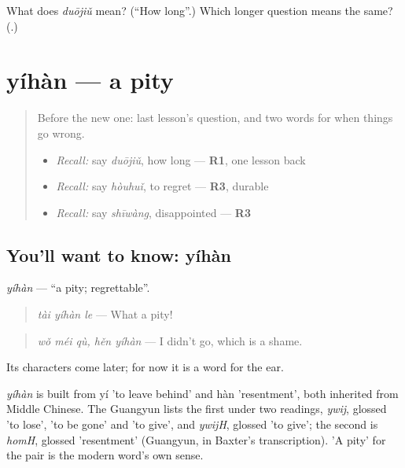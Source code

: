 \begin{tcolorbox}[breakable,colback=teal!4,colframe=teal!35!black,title={Before you move on}]
What does \emph{duōjiǔ} mean? (\textquotedblleft{}How long\textquotedblright{}.) Which longer question means the same? (\textbf{}.)
\end{tcolorbox}
\section[yíhàn]{yíhàn — a pity}

\label{lesson:ZH-C286-yihan}



\begin{quote}
Before the new one: last lesson's question, and two words for when things go wrong.

\begin{itemize}
\raggedright
  \item \emph{Recall:} say \emph{duōjiǔ}, how long — \textbf{R1}, one lesson back
  \item \emph{Recall:} say \emph{hòuhuǐ}, to regret — \textbf{R3}, durable
  \item \emph{Recall:} say \emph{shīwàng}, disappointed — \textbf{R3}
\end{itemize}
\end{quote}

\subsection*{You'll want to know: yíhàn}
\emph{yíhàn} — \textquotedblleft{}a pity; regrettable\textquotedblright{}.

\begin{quote}
\emph{tài yíhàn le} — What a pity!
\end{quote}

\begin{quote}
\emph{wǒ méi qù, hěn yíhàn} — I didn't go, which is a shame.
\end{quote}

Its characters come later; for now it is a word for the ear.

\begin{cousinweb}
\emph{yíhàn} is built from yí 'to leave behind' and hàn 'resentment', both inherited from Middle Chinese. The Guangyun lists the first under two readings, \emph{ywij}, glossed 'to lose', 'to be gone' and 'to give', and \emph{ywijH}, glossed 'to give'; the second is \emph{homH}, glossed 'resentment' (Guangyun, in Baxter's transcription). 'A pity' for the pair is the modern word's own sense.
\end{cousinweb}

